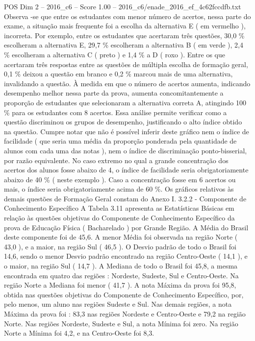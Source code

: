 \begin{textsample}{POS Dim 2 – 2016\_c6 – Score 1.00 – 2016\_c6/enade\_2016\_ef\_4c62fccdfb.txt}
Observa -se que entre os estudantes com menor número de acertos, nessa parte do exame, a situação mais frequente foi a escolha da alternativa E ( em vermelho ), incorreta.
Por exemplo, entre os estudantes que acertaram três questões, 30,0 \% escolheram a alternativa E, 29,7 \% escolheram a alternativa B ( em verde ), 2,4 \% escolheram a alternativa C ( preto ) e 1,4 \% a D ( roxo ).
Entre os que acertaram três respostas entre as questões de múltipla escolha de formação geral, 0,1 \% deixou a questão em branco e 0,2 \% marcou mais de uma alternativa, invalidando a questão.
À medida em que o número de acertos aumenta, indicando desempenho melhor nessa parte da prova, aumenta concomitantemente a proporção de estudantes que selecionaram a alternativa correta A, atingindo 100 \% para os estudantes com 8 acertos.
Essa análise permite verificar como a questão discriminou os grupos de desempenho, justificando o alto índice obtido na questão.
Cumpre notar que não é possível inferir deste gráfico nem o índice de facilidade ( que seria uma média da proporção ponderada pela quantidade de alunos com cada uma das notas ), nem o índice de discriminação ponto-bisserial, por razão equivalente.
No caso extremo no qual a grande concentração dos acertos dos alunos fosse abaixo de 4, o índice de facilidade seria obrigatoriamente abaixo de 40 \% ( neste exemplo ).
Caso a concentração fosse em 6 acertos ou mais, o índice seria obrigatoriamente acima de 60 \%.
Os gráficos relativos às demais questões de Formação Geral constam do Anexo I. 3.2.2 - Componente de Conhecimento Específico A Tabela 3.11 apresenta as Estatísticas Básicas em relação às questões objetivas do Componente de Conhecimento Específico da prova de Educação Física ( Bacharelado ) por Grande Região.
A Média do Brasil deste componente foi de 45,6.
A menor Média foi observada na região Norte ( 43,0 ), e a maior, na região Sul ( 46,5 ).
O Desvio padrão de todo o Brasil foi 14,6, sendo o menor Desvio padrão encontrado na região Centro-Oeste ( 14,1 ), e o maior, na região Sul ( 14,7 ).
A Mediana de todo o Brasil foi 45,8, a mesma encontrada em quatro das regiões : Nordeste, Sudeste, Sul e Centro-Oeste.
Na região Norte a Mediana foi menor ( 41,7 ).
A nota Máxima da prova foi 95,8, obtida nas questões objetivas do Componente de Conhecimento Específico, por, pelo menos, um aluno nas regiões Sudeste e Sul.
Nas demais regiões, a nota Máxima da prova foi : 83,3 nas regiões Nordeste e Centro-Oeste e 79,2 na região Norte.
Nas regiões Nordeste, Sudeste e Sul, a nota Mínima foi zero.
Na região Norte a Mínima foi 4,2, e na Centro-Oeste foi 8,3.

\end{textsample}

